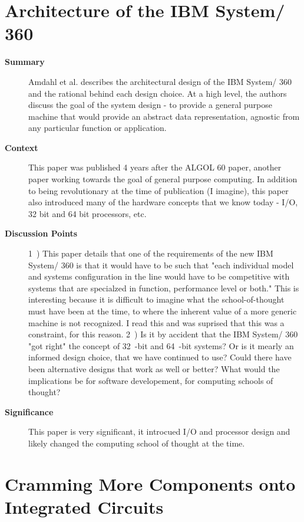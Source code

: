 \section {Architecture of the IBM System/ 360 \cite{amdahl1964architecture}}

\begin{description}
    \item[\textbf{Summary}]
    Amdahl et al. describes the architectural design of the IBM System/ 360 and
    the rational behind each design choice. At a high level, the authors discuss
    the goal of the system design - to provide a general purpose machine that
    would provide an abstract data representation, agnostic from any particular
    function or application.
    \item[\textbf{Context}]
    This paper was published 4 years after the ALGOL 60 paper, another paper
    working towards the goal of general purpose computing. In addition to being
    revolutionary at the time of publication (I imagine), this paper also
    introduced many of the hardware concepts that we know today - I/O, 32 bit
    and 64 bit processors, etc.
    \item[\textbf{Discussion Points}]
    1~) This paper details that one of the requirements of the new IBM System/
    360 is that it would have to be such that "each individual model and
    systems configuration in the line would have to be competitive with systems
    that are specialzed in function, performance level or both." This is
    interesting because it is difficult to imagine what the school-of-thought
    must have been at the time, to where the inherent value of a more generic
    machine is not recognized. I read this and was suprised that this was a
    constraint, for this reason.
    2~) Is it by accident that the IBM System/ 360 "got right" the concept of
    32~-bit and 64~-bit systems? Or is it mearly an informed design choice, that
    we have continued to use? Could there have been alternative designs that
    work as well or better? What would the implications be for software
    developement, for computing schools of thought?
    \item[\textbf{Significance}]
    This paper is very significant, it introcued I/O and processor design and
    likely changed the computing school of thought at the time.
\end{description}

\section {Cramming More Components onto Integrated Circuits
\cite{moore1965cramming}}

